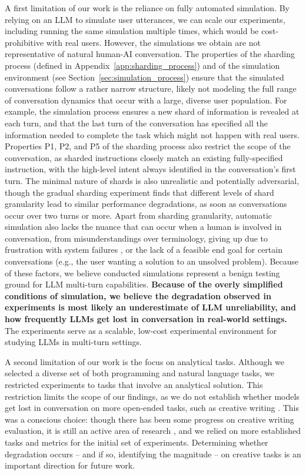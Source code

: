 \documentclass{article}
\begin{document}
A first limitation of our work is the reliance on fully automated simulation. By relying on an LLM to simulate user utterances, we can scale our experiments, including running the same simulation multiple times, which would be cost-prohibitive with real users. However, the simulations we obtain are not representative of natural human-AI conversation. The properties of the sharding process (defined in Appendix~\ref{app:sharding_process}) and of the simulation environment (see Section~\ref{sec:simulation_process}) ensure that the simulated conversations follow a rather narrow structure, likely not modeling the full range of conversation dynamics that occur with a large, diverse user population. For example, the simulation process ensures a new shard of information is revealed at each turn, and that the last turn of the conversation has specified all the information needed to complete the task which might not happen with real users. Properties P1, P2, and P5 of the sharding process also restrict the scope of the conversation, as sharded instructions closely match an existing fully-specified instruction, with the high-level intent always identified in the conversation's first turn. The minimal nature of shards is also unrealistic and potentially adversarial, though the gradual sharding experiment finds that different levels of shard granularity lead to similar performance degradations, as soon as conversations occur over two turns or more.
Apart from sharding granularity, automatic simulation also lacks the nuance that can occur when a human is involved in conversation, from misunderstandings over terminology, giving up due to frustration with system failures \cite{wester2024ai}, or the lack of a feasible end goal for certain conversations (e.g., the user wanting a solution to an unsolved problem). Because of these factors, we believe conducted simulations represent a benign testing ground for LLM multi-turn capabilities. \textbf{Because of the overly simplified conditions of simulation, we believe the degradation observed in experiments is most likely an underestimate of LLM unreliability, and how frequently LLMs get lost in conversation in real-world settings.} The experiments serve as a scalable, low-cost experimental environment for studying LLMs in multi-turn settings.

A second limitation of our work is the focus on analytical tasks. Although we selected a diverse set of both programming and natural language tasks, we restricted experiments to tasks that involve an analytical solution. This restriction limits the scope of our findings, as we do not establish whether models get lost in conversation on more open-ended tasks, such as creative writing \cite{chakrabarty2024art}. This was a conscious choice: though there has been some progress on creative writing evaluation, it is still an active area of research \cite{chakrabarty2025ai}, and we relied on more established tasks and metrics for the initial set of experiments. Determining whether degradation occurs -- and if so, identifying the magnitude -- on creative tasks is an important direction for future work.
\end{document}
